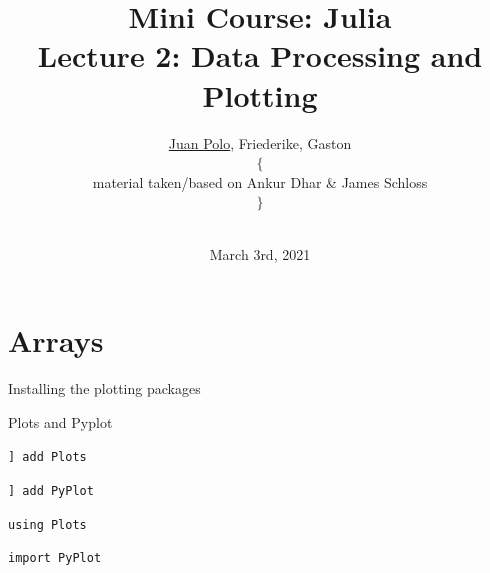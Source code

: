 \documentclass{beamer}
\title[Mini Course]{
Mini Course: Julia\\
\small
Lecture 2: Data Processing and Plotting} %
\author[Juan Polo]{\vspace{-0.75cm} \underline{Juan Polo}, Friederike, Gaston {\tiny $\Bigg\{$ \parbox{2cm}{\centering material taken/based on Ankur Dhar \& James Schloss}$\Bigg\}$}} %
\institute[OIST] %
{
	\textit{juan.polo@oist.jp} \\ %
}
\date{\vspace*{-0.5cm}\\ March 3rd, 2021} %
\begin{document}

\begin{frame}
\vspace*{1.4cm}
\titlepage %
\end{frame}



\begin{frame}
  \tableofcontents
\end{frame}
\section{Arrays}



\begin{frame}[fragile]{Installing the plotting packages}

\begin{block}{Plots and Pyplot}

{\color{red} \verb|] add Plots|}

{\color{red} \verb|] add PyPlot|}


{\color{red} \verb|using Plots|}

{\color{red} \verb|import PyPlot|}



\end{block}


\end{frame}
\end{document}
